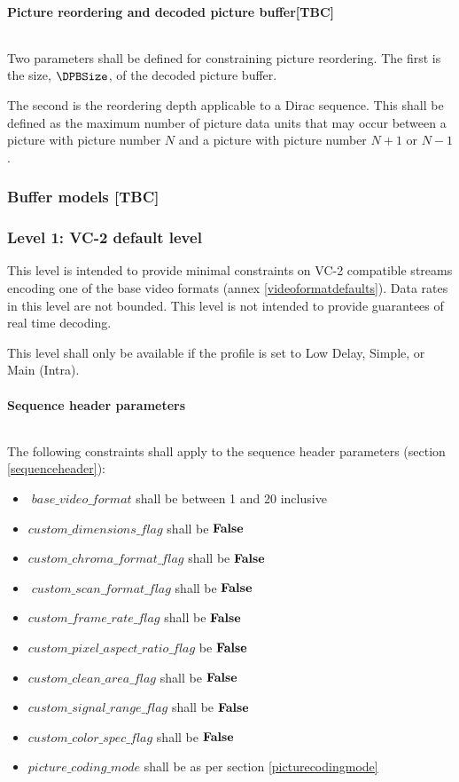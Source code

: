 \paragraph{Picture reordering and decoded picture buffer[TBC]}$\ $\newline
\label{picturereordering}

Two parameters shall be defined for constraining picture reordering.
The first is the size, $\DPBSize$, of the decoded picture buffer.

The second is the reordering depth applicable to a Dirac sequence. This shall
be defined as the maximum number of picture data units that may occur 
between a picture with picture number $N$ and a picture with picture number
$N+1$ or $N-1$.

\subsubsection{Buffer models [TBC]}


\subsubsection{Level 1: VC-2 default level}

This level is intended to provide minimal constraints on VC-2 compatible
streams encoding one of the base video formats 
(annex \ref{videoformatdefaults}). Data rates in 
this level are not bounded. This level is not intended to provide
guarantees of real time decoding.

This level shall only be available if the profile is set to Low Delay, Simple, or
Main (Intra).

\paragraph{Sequence header parameters}$\ $\newline

The following constraints shall apply to the sequence header parameters
(section \ref{sequenceheader}):
\begin{itemize}
\item$base\_video\_format$ shall be between 1 and 20 inclusive
\item $custom\_dimensions\_flag$ shall be $\text{\bf{False}}$
\item $custom\_chroma\_format\_flag$ shall be $\text{\bf{False}}$
\item$custom\_scan\_format\_flag$ shall be $\text{\bf{False}}$
\item $custom\_frame\_rate\_flag$ shall be $\text{\bf{False}}$
\item $custom\_pixel\_aspect\_ratio\_flag$ be $\text{\bf{False}}$
\item $custom\_clean\_area\_flag$ shall be $\text{\bf{False}}$
\item $custom\_signal\_range\_flag$ shall be $\text{\bf{False}}$
\item $custom\_color\_spec\_flag$ shall be $\text{\bf{False}}$
\item $picture\_coding\_mode$ shall be as per section \ref{picturecodingmode}
\end{itemize}


